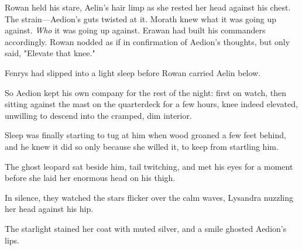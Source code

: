 Rowan held his stare, Aelin's hair limp as she rested her head against his chest. The strain---Aedion's guts twisted at it. Morath knew what it was going up against. \emph{Who} it was going up against. Erawan had built his commanders accordingly. Rowan nodded as if in confirmation of Aedion's thoughts, but only said, "Elevate that knee."

Fenrys had slipped into a light sleep before Rowan carried Aelin below.

So Aedion kept his own company for the rest of the night: first on watch, then sitting against the mast on the quarterdeck for a few hours, knee indeed elevated, unwilling to descend into the cramped, dim interior.

Sleep was finally starting to tug at him when wood groaned a few feet behind, and he knew it did so only because she willed it, to keep from startling him.

The ghost leopard sat beside him, tail twitching, and met his eyes for a moment before she laid her enormous head on his thigh.

In silence, they watched the stars flicker over the calm waves, Lysandra nuzzling her head against his hip.

The starlight stained her coat with muted silver, and a smile ghosted Aedion's lips.
